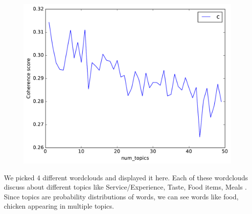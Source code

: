\documentclass{neu_handout}
\begin{document}
\begin{figure}[h]
\centering
{
\includegraphics[width=0.3\linewidth]{negative_coherence-topics}
}
\end{figure}

We picked 4 different wordclouds and displayed it here. Each of these wordclouds discuss about different topics like Service/Experience, Taste, Food items, Meals . Since topics are probability distributions of words, we can see words like food, chicken appearing in multiple topics. 

\begin{figure}[h]
\centering
{}
\end{figure}

\begin{figure}[h]
\centering
{}
\end{figure}
\end{document}
